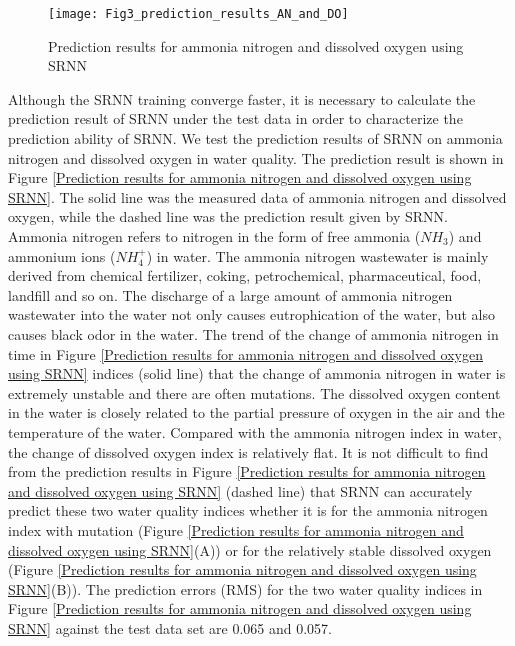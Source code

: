 \documentclass[runningheads]{llncs}
\begin{document}
\begin{figure}[htbp]
\centering
\texttt{[image: Fig3\_prediction\_results\_AN\_and\_DO]}
\caption{Prediction results for ammonia nitrogen and dissolved oxygen using SRNN}
\label{Prediction results for ammonia nitrogen and dissolved oxygen using SRNN}
\end{figure}

Although the SRNN training converge faster, it is necessary to 
calculate the prediction result of SRNN under the test data in 
order to characterize the prediction ability of SRNN. 
We test the prediction results of SRNN on 
ammonia nitrogen and dissolved oxygen in water quality. 
The prediction result is shown in Figure \ref{Prediction results for ammonia nitrogen
and dissolved oxygen using SRNN}. The solid line 
was the measured data of ammonia nitrogen and dissolved oxygen, 
while the dashed line was the prediction result given by SRNN. 
Ammonia nitrogen refers to nitrogen in the form of free ammonia 
($NH_3$) and ammonium ions ($NH_4^+$) in water. The ammonia nitrogen 
wastewater is mainly derived from chemical fertilizer, coking, 
petrochemical, pharmaceutical, food, landfill and so on. 
The discharge of a large amount of ammonia nitrogen wastewater 
into the water not only causes eutrophication of the water, 
but also causes black odor in the water.
The trend of the change of ammonia nitrogen in time in Figure \ref{Prediction results for ammonia nitrogen
and dissolved oxygen using SRNN} 
indices (solid line) that the change of ammonia nitrogen in water 
is extremely unstable and there are often mutations. 
The dissolved oxygen content in the water is closely related to
the partial pressure of oxygen in the air and the 
temperature of the water. Compared with the ammonia nitrogen 
index in water, the change of dissolved oxygen index 
is relatively flat. It is not difficult to find from the prediction 
results in Figure \ref{Prediction results for ammonia nitrogen
and dissolved oxygen using SRNN} 
(dashed line) that SRNN can accurately predict 
these two water quality indices whether it is for the 
ammonia nitrogen index with mutation (Figure \ref{Prediction results for ammonia nitrogen
and dissolved oxygen using SRNN}(A)) or 
for the relatively stable dissolved oxygen 
(Figure \ref{Prediction results for ammonia nitrogen
and dissolved oxygen using SRNN}(B)). 
The prediction errors (RMS) for the two water quality 
indices in Figure \ref{Prediction results for ammonia nitrogen
and dissolved oxygen using SRNN} against the test data set are 0.065 and 0.057.
\end{document}
